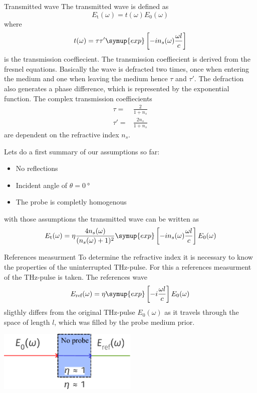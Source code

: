 \documentclass[aspectratio=1610, 9pt]{beamer}
\begin{document}
\begin{frame}{Transmitted wave}
  The transmitted wave is defined as 
  \begin{equation}
    E_\text{t}(\omega) = t(\omega) E_0(\omega)
  \end{equation}
  where
  \begin{equation}
    t(\omega) = \tau \tau' \symup{exp}\left[- i n_s(\omega) \frac{\omega l }{c}\right]
  \end{equation}
  is the transmission coeffiecient.
  The transmission coeffiecient is derived from the fresnel equations.
  Basically the wave is defracted two times, once when entering the medium and one when leaving the medium hence $\tau$ and $\tau'$.
  The defraction also generates a phase difference, which is represented by the exponential function.
  The complex transmission coeffiecients 
  \begin{align}
    \tau = & \frac{2}{1 + n_s} \\
    \tau' = &  \frac{2 n_s}{1+ n_s} 
  \end{align}
  are dependent on the refractive index $n_s$.
\end{frame}

\begin{frame}
  Lets do a first summary of our assumptions so far:
  \begin{itemize}
    \item No reflections
    \item Incident angle of $\theta=\SI{0}{\degree}$
    \item The probe is completly homogenous
  \end{itemize}
  with those assumptions the transmitted wave can be written as 
  \begin{equation}
    E_\text{t}(\omega) = \eta\frac{4 n_s (\omega)}{(n_s(\omega) + 1)^2} \symup{exp}\left[ -i n_s (\omega) \frac{\omega l }{c}\right] E_0(\omega)
  \end{equation}
\end{frame}

\begin{frame}{References measurment}
  To determine the refractive index it is necessary to know the properties of the uninterrupted THz-pulse.
  For this a references measurment of the THz-pulse is taken.
  The references wave 
  \begin{equation}
  E_\text{ref}(\omega) = \eta \symup{exp}\left[ -i \frac{\omega l }{c}\right] E_0(\omega)  
  \end{equation}
  sligthly differs from the original THz-pulse $E_0(\omega)$ as it travels through the space of length $l$, which was filled by the probe medium prior.
  \begin{center}
  \includegraphics[width=0.5\textwidth]{images/reference.pdf}
  \end{center}
\end{frame}
\end{document}
